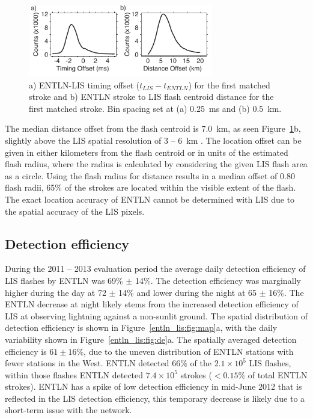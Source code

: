 \begin{figure}[t]
   \centering
   \noindent\includegraphics[width=19pc,angle=0]{entln_lis/Figures/accuracy.pdf}
   \caption{a) ENTLN-LIS timing offset ($t_{LIS} - t_{ENTLN}$) for the first matched stroke and
   		b) ENTLN stroke to LIS flash centroid distance for the first matched stroke.
   		Bin spacing set at (a) 0.25~ms and (b) 0.5~km.}
   \label{entln_lis:fig:accuracy}
\end{figure}

The median distance offset from the flash centroid is 7.0~km, as seen Figure~\ref{entln_lis:fig:accuracy}b, slightly above the LIS spatial resolution of 3 -- 6~km \citep{Christian1999}.
The location offset can be given in either kilometers from the flash centroid or in units of the estimated flash radius, where the radius is calculated by considering the given LIS flash area as a circle.
Using the flash radius for distance results in a median offset of 0.80 flash radii, 65\% of the strokes are located within the visible extent of the flash.
The exact location accuracy of ENTLN cannot be determined with LIS due to the spatial accuracy of the LIS pixels.

\subsection{Detection efficiency}

During the 2011 -- 2013 evaluation period the average daily detection efficiency of LIS flashes by ENTLN was 69\% $\pm$ 14\%.
The detection efficiency was marginally higher during the day at 72 $\pm$ 14\% and lower during the night at 65 $\pm$ 16\%.
The ENTLN decrease at night likely stems from the increased detection efficiency of LIS at observing lightning against a non-sunlit ground.
The spatial distribution of detection efficiency is shown in Figure~\ref{entln_lis:fig:map}a, with the daily variability shown in Figure~\ref{entln_lis:fig:de}a.
The spatially averaged detection efficiency is $61 \pm 16$\%, due to the uneven distribution of ENTLN stations with fewer stations in the West.
ENTLN detected 66\% of the $2.1\times10^5$ LIS flashes, within those flashes ENTLN detected $7.4\times10^5$ strokes ($<0.15$\% of total ENTLN strokes).
ENTLN has a spike of low detection efficiency in mid-June 2012 that is reflected in the LIS detection efficiency, this temporary decrease is likely due to a short-term issue with the network.

